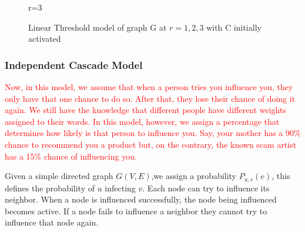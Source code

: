 \begin{figure}[h!]
\begin{minipage}{0.45\textwidth}
\caption{r=3}
	\end{minipage}
\caption{Linear Threshold model of graph G at $r=1,2,3$ with C initially activated}
\label{linearfig}
\end{figure}

\subsubsection{Independent Cascade Model}
\textcolor{red}{Now, in this model, we assume that when a person tries you influence you, they only have that one chance to do so. After that, they lose their chance of doing it again. We still have the knowledge that different people have different weights assigned to their words. In this model, however, we assign a percentage that determines how likely is that person to influence you. Say, your mother has a 90\% chance to recommend you a product but, on the contrary, the known scam artist has a 15\% chance of influencing you.}

Given a simple directed graph $G(V,E)$,we assign a probability $P_{u,v}(e)$, this defines the probability of $u$ infecting $v$. Each node can try to influence its neighbor. When a node is influenced successfully, the node being influenced becomes active. If a node fails to influence a neighbor they cannot try to influence that node again.\cite{Kempe}\cite{Shakarian:2012:LSN:2456719.2457081}

